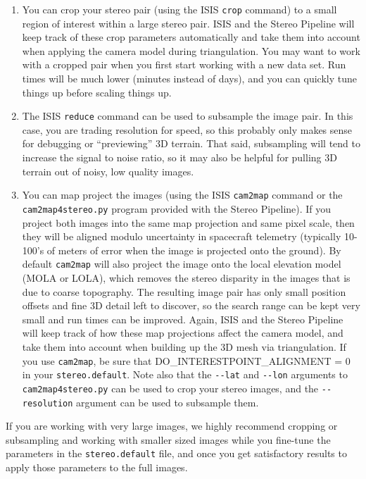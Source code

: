 \begin{enumerate}
\item You can crop your stereo pair (using the ISIS \texttt{crop}
command) to a small region of interest within a
large stereo pair.  ISIS and the Stereo Pipeline will keep track
of these crop parameters automatically and take them into account
when applying the camera model during triangulation.  You may want
to work with a cropped pair when you first start working with a new
data set.  Run times will be much lower (minutes instead of days),
and you can quickly tune things up before scaling things up.

\item The ISIS \texttt{reduce} command can be used to subsample the
image pair.  In this case, you are trading resolution for speed,
so this probably only makes sense for debugging or ``previewing'' 3D
terrain. That said, subsampling will tend to increase the signal
to noise ratio, so it may also be helpful for pulling 3D terrain
out of noisy, low quality images.

\item You can map project the images (using the ISIS \texttt{cam2map}
command or the \texttt{cam2map4stereo.py} program provided with the
Stereo Pipeline).  If you project both images into the same map
projection and same pixel scale, then they will be aligned modulo
uncertainty in spacecraft telemetry (typically 10-100's of meters
of error when the image is projected onto the ground).  By default
\texttt{cam2map} will also project the image onto the local elevation
model (MOLA or LOLA), which removes the stereo disparity in the
images that is due to coarse topography.  The resulting image pair
has only small position offsets and fine 3D detail left to discover,
so the search range can be kept very small and run times can be
improved.  Again, ISIS and the Stereo Pipeline will keep track of
how these map projections affect the camera model, and take them
into account when building up the 3D mesh via triangulation.  If
you use \texttt{cam2map}, be sure that DO\_INTERESTPOINT\_ALIGNMENT
= 0 in your \texttt{stereo.default}.  Note also that the \texttt{-\/-lat}
and \texttt{-\/-lon} arguments to \texttt{cam2map4stereo.py} can be
used to crop your stereo images, and the \texttt{-\/-resolution}
argument can be used to subsample them.
\end{enumerate}

If you are working with very large images, we highly recommend
cropping or subsampling and working with smaller sized images while
you fine-tune the parameters in the \texttt{stereo.default} file,
and once you get satisfactory results to apply those parameters to
the full images.


